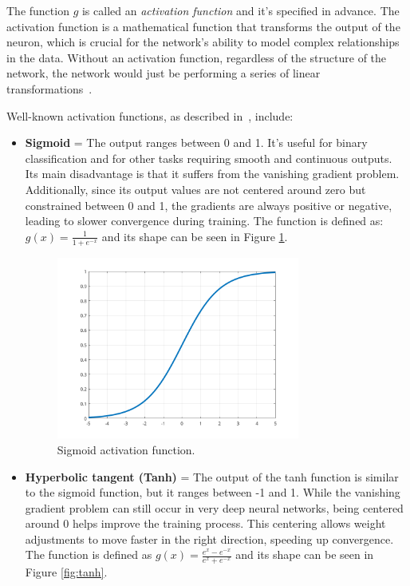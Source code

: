 \documentclass[a4paper,oneside,onecolumn,12pt]{book}
\begin{document}
	The function $g$ is called an \textit{activation function} and it's specified in advance. The activation function is a mathematical function that transforms the output of the neuron, which is crucial for the network's ability to model complex relationships in the data. Without an activation function, regardless of the structure of the network, the network would just be performing a series of linear transformations~\cite{DLP}.
	
	Well-known activation functions, as described in~\cite{AFNNHCRO}, include:
	\begin{itemize}
		\item \textbf{Sigmoid} = The output ranges between 0 and 1. It's useful for binary classification and for other tasks requiring smooth and continuous outputs. Its main disadvantage is that it suffers from the vanishing gradient problem. Additionally, since its output values are not centered around zero but constrained between 0 and 1, the gradients are always positive or negative, leading to slower convergence during training. The function is defined as: $g(x) = \frac{1}{1 + e^{-x}}$ and its shape can be seen in Figure \ref{fig:sigmoid}.
		\begin{figure}[H]
		\begin{center}
			\includegraphics[keepaspectratio,width=8cm]{kep/sigmoid.png}
			\caption{Sigmoid activation function.}
			\label{fig:sigmoid}
		\end{center}
		\end{figure}
		\item \textbf{Hyperbolic tangent (Tanh)} = The output of the tanh function is similar to the sigmoid function, but it ranges between -1 and 1. While the vanishing gradient problem can still occur in very deep neural networks, being centered around 0 helps improve the training process. This centering allows weight adjustments to move faster in the right direction, speeding up convergence. The function is defined as $g(x) = \frac{e^x - e^{-x}}{e^x + e^{-x}}$ and its shape can be seen in Figure \ref{fig:tanh}.

\end{itemize}
\end{document}

